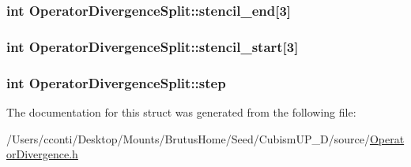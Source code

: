 \subsubsection[{stencil\+\_\+end}]{\setlength{\rightskip}{0pt plus 5cm}int Operator\+Divergence\+Split\+::stencil\+\_\+end\mbox{[}3\mbox{]}}\label{struct_operator_divergence_split_a174562235d758ddfc898dd89f6bf4f8b}
\hypertarget{struct_operator_divergence_split_a14fbd9270473cbd1915523b7b9dec057}{}
\subsubsection[{stencil\+\_\+start}]{\setlength{\rightskip}{0pt plus 5cm}int Operator\+Divergence\+Split\+::stencil\+\_\+start\mbox{[}3\mbox{]}}\label{struct_operator_divergence_split_a14fbd9270473cbd1915523b7b9dec057}
\hypertarget{struct_operator_divergence_split_add46415c643d7ba724e43bbd13628669}{}
\subsubsection[{step}]{\setlength{\rightskip}{0pt plus 5cm}int Operator\+Divergence\+Split\+::step}\label{struct_operator_divergence_split_add46415c643d7ba724e43bbd13628669}


The documentation for this struct was generated from the following file\+:\begin{DoxyCompactItemize}
\item 
/\+Users/cconti/\+Desktop/\+Mounts/\+Brutus\+Home/\+Seed/\+Cubism\+U\+P\+\_\+D/source/\hyperlink{_operator_divergence_8h}{Operator\+Divergence.\+h}\end{DoxyCompactItemize}
